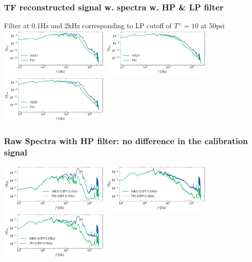 \documentclass[aspectratio=169,9pt]{beamer}
\begin{document}
\begin{frame}
    \frametitle{TF reconstructed signal w. spectra w. HP \& LP filter}
    Filter at 0.1Hz and 2kHz corresponding to LP cutoff of $T^+=10$ at 50psi
        \centering
        \includegraphics[width=0.4\textwidth]{sanity/50psi/PH-NKD/calib_spectra_50psi_nn_filt.pdf}
        \includegraphics[width=0.4\textwidth]{sanity/50psi/PH-NKD/calib_spectra_50psi_fn_filt.pdf}
        \includegraphics[width=0.4\textwidth]{sanity/50psi/PH-NKD/calib_spectra_50psi_an_filt.pdf}
\end{frame}


\begin{frame}
  \frametitle{Raw Spectra with HP filter: no difference in the calibration signal}
    \centering
    \includegraphics[width=0.4\textwidth]{sanity/50psi/PH-NKD/calib_spectra_50psi_hpf_nonoise.pdf}
    \includegraphics[width=0.4\textwidth]{sanity/50psi/PH-NKD/calib_spectra_50psi_hpf_noise.pdf}
    \includegraphics[width=0.4\textwidth]{sanity/50psi/PH-NKD/calib_spectra_50psi_hpf_noiseWN.pdf}
\end{frame}
\end{document}
